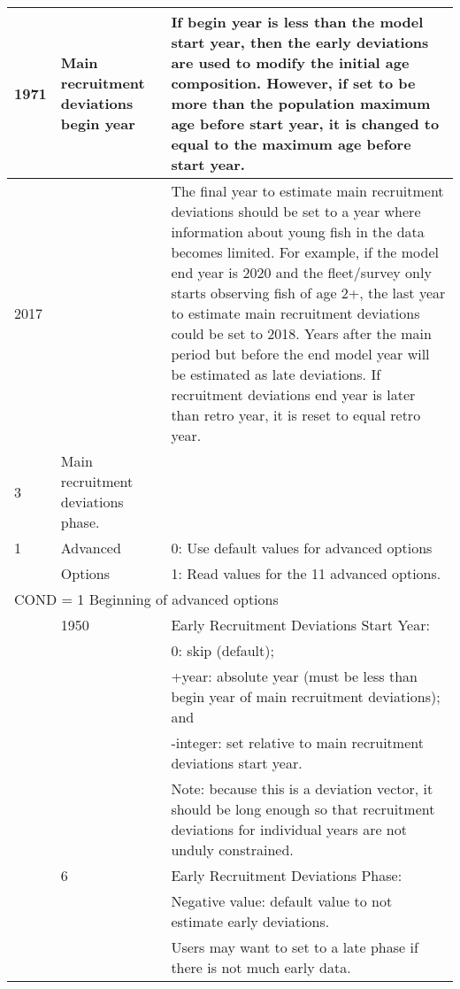 \begin{longtable}{p{1cm} p{3cm} p{11cm}}
	1971 \Tstrut & Main recruitment deviations begin year & If begin year is less than the model start year, then the early deviations are used to modify the initial age composition. However, if set to be more than the population maximum age before start year, it is changed to equal to the maximum age before start year. \Bstrut\\
	\hline

	2017 \Tstrut & \raisebox{0.1\ht\strutbox}{\hypertarget{RecDevEndYear}{Main recruitment deviations end year}} & The final year to estimate main recruitment deviations should be set to a year where information about young fish in the data becomes limited. For example, if the model end year is 2020 and the fleet/survey only starts observing fish of age 2+, the last year to estimate main recruitment deviations could be set to 2018. Years after the main period but before the end model year will be estimated as late deviations. If recruitment deviations end year is later than retro year, it is reset to equal retro year. \Bstrut\\
	\hline

	3 \Tstrut & Main recruitment deviations phase. & \Bstrut\\
	\hline

	1 \Tstrut & Advanced & 0: Use default values for advanced options \\ 
	& Options & 1: Read values for the 11 advanced options. \Bstrut\\
	\hline

	\multicolumn{3}{l}{COND = 1 Beginning of advanced options} \Tstrut\Bstrut\\
	& 1950 & Early Recruitment Deviations Start Year: \\
	& & 0: skip (default); \\
	& & +year: absolute year (must be less than begin year of main recruitment deviations); and \\
	& & -integer: set relative to main recruitment deviations start year. \\
	& & Note: because this is a deviation vector, it should be long enough so that recruitment deviations for individual years are not unduly constrained. \\

	\Tstrut & 6 & Early Recruitment Deviations Phase: \\
	& & Negative value: default value to not estimate early deviations. \\
	& & Users may want to set to a late phase if there is not much early data. \\
	

\end{longtable}
